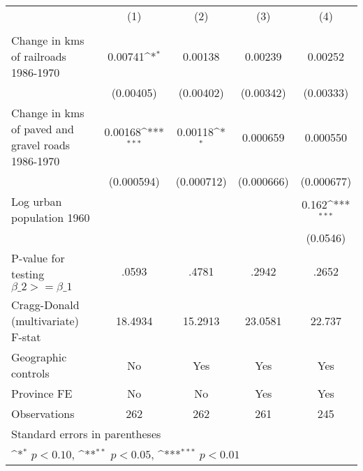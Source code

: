 {
\def\sym#1{\ifmmode^{#1}\else\(^{#1}\)\fi}
\begin{tabular}{l*{4}{c}}
\hline\hline
                &\multicolumn{1}{c}{(1)}&\multicolumn{1}{c}{(2)}&\multicolumn{1}{c}{(3)}&\multicolumn{1}{c}{(4)}\\
                &\multicolumn{1}{c}{}&\multicolumn{1}{c}{}&\multicolumn{1}{c}{}&\multicolumn{1}{c}{}\\
\hline
Change in kms of railroads 1986-1970&  0.00741\sym{*}  &  0.00138         &  0.00239         &  0.00252         \\
                &(0.00405)         &(0.00402)         &(0.00342)         &(0.00333)         \\
[1em]
Change in kms of paved and gravel roads 1986-1970&  0.00168\sym{***}&  0.00118\sym{*}  & 0.000659         & 0.000550         \\
                &(0.000594)         &(0.000712)         &(0.000666)         &(0.000677)         \\
[1em]
Log urban population 1960&                  &                  &                  &    0.162\sym{***}\\
                &                  &                  &                  & (0.0546)         \\
\hline
P-value for testing $\beta\_{2} >= \beta\_{1}$&    .0593         &    .4781         &    .2942         &    .2652         \\
Cragg-Donald (multivariate) F-stat&  18.4934         &  15.2913         &  23.0581         &   22.737         \\
Geographic controls&       No         &      Yes         &      Yes         &      Yes         \\
Province FE     &       No         &       No         &      Yes         &      Yes         \\
Observations    &      262         &      262         &      261         &      245         \\
\hline\hline
\multicolumn{5}{l}{\footnotesize Standard errors in parentheses}\\
\multicolumn{5}{l}{\footnotesize \sym{*} \(p<0.10\), \sym{**} \(p<0.05\), \sym{***} \(p<0.01\)}\\
\end{tabular}
}
